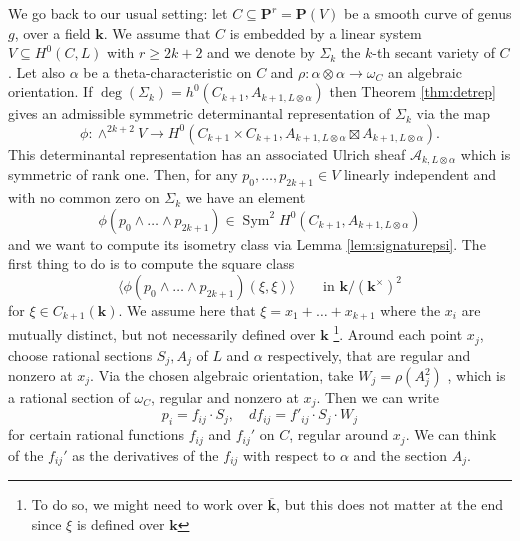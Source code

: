 \documentclass[12pt]{amsart}
\numberwithin{equation}{section}
\numberwithin{thmcounter}{section}
\theoremstyle{definition}
\theoremstyle{claim}
\newcommand{\kk}{\mathbf{k}}
\newcommand{\nP}{\mathbf{P}}
\newcommand{\sA}{\mathscr{A}}
\begin{document}
We go back to our usual setting: let $C\subseteq \nP^r = \nP(V)$ be  a smooth curve of genus $g$,  over a field $\kk$. We assume that $C$ is embedded by a linear system $V\subseteq H^0(C,L)$ with $r\geq 2k+2$ and we denote by  $\Sigma_k$ the $k$-th secant variety of $C$. Let also $\alpha$ be a theta-characteristic on $C$ and  $\rho\colon \alpha\otimes\alpha \to \omega_C$ an algebraic orientation. If  $\deg(\Sigma_k)=h^0(C_{k+1},A_{k+1,L\otimes \alpha})$ then Theorem \ref{thm:detrep} gives an admissible symmetric determinantal representation of $\Sigma_k$ via the map
\[\phi\colon \wedge^{2k+2} V \longrightarrow H^0(C_{k+1}\times C_{k+1},A_{k+1,L\otimes\alpha}\boxtimes A_{k+1,L\otimes \alpha}). \]
This determinantal representation has an associated Ulrich sheaf $\sA_{k,L\otimes\alpha}$ which is symmetric of rank one. Then, for any $p_0,\dots,p_{2k+1}\in V$ linearly independent and with no common zero on $\Sigma_k$ we have an element
\[ \phi(p_0\wedge \dots \wedge p_{2k+1}) \in \operatorname{Sym}^2 H^0(C_{k+1},A_{k+1,L\otimes\alpha}) \]
and we want to compute its isometry class via Lemma \ref{lem:signaturepsi}. The first thing to do is to compute the square class
\[ \langle \phi(p_0\wedge \dots \wedge p_{2k+1})(\xi,\xi) \rangle \qquad \text{in } \kk/(\kk^{\times})^2 \]
for $\xi\in C_{k+1}(\kk)$. We assume here that $\xi = x_1+\dots+x_{k+1}$ where the $x_i$ are mutually distinct, but not necessarily defined over $\kk$ \footnote{ To do so, we might need to work over $\overline{\kk}$, but this does not matter at the end since $\xi$ is defined over $\kk$}. Around each point $x_j$, choose  rational sections $S_j,A_j$ of $L$ and $\alpha$ respectively, that are regular and nonzero at $x_j$. Via the chosen algebraic orientation, take $W_j = \rho(A_j^{2})$ , which is a rational section of $\omega_C$, regular and nonzero at $x_j$. Then we can write
\[ p_i = f_{ij}\cdot S_j, \quad df_{ij} = f'_{ij}\cdot S_j\cdot W_j  \]
for certain rational functions $f_{ij}$ and $f_{ij}'$ on $C$, regular around $x_j$.  We can think of the $f_{ij}'$ as the derivatives of the $f_{ij}$ with respect to $\alpha$ and the section $A_j$.
\end{document}

